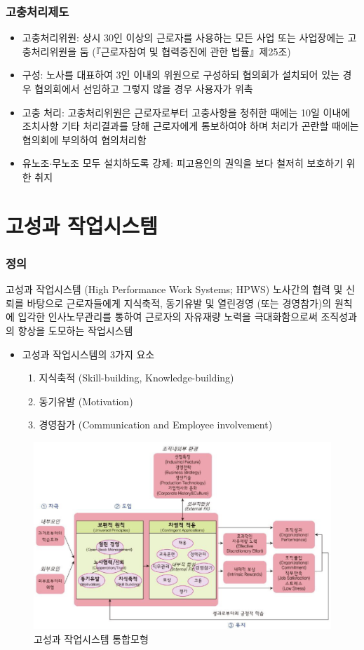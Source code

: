 \documentclass[aspectratio=169,xcolor=dvipsnames,handout]{beamer}
\begin{document}
\begin{frame}
    \frametitle{고충처리제도}
    \begin{itemize}[<+->]
        \item 고충처리위원: 상시 30인 이상의 근로자를 사용하는 모든 사업 또는 사업장에는 고충처리위원을 둠 (『근로자참여 및 협력증진에 관한 법률』제25조)
        \item 구성: 노사를 대표하여 3인 이내의 위원으로 구성하되 협의회가 설치되어 있는 경우 협의회에서 선임하고 그렇지 않을 경우 사용자가 위촉
        \item 고충 처리: 고충처리위원은 근로자로부터 고충사항을 청취한 때에는 10일 이내에 조치사항 기타 처리결과를 당해 근로자에게 통보하여야 하며 처리가 곤란할 때에는 협의회에 부의하여 협의처리함
        \item 유노조$\cdot$무노조 모두 설치하도록 강제: 피고용인의 권익을 보다 철저히 보호하기 위한 취지
    \end{itemize}
\end{frame}

\section{고성과 작업시스템}

\begin{frame}[allowframebreaks]
    \frametitle{정의}
    \begin{block}{고성과 작업시스템 (High Performance Work Systems; HPWS)}
        노사간의 협력 및 신뢰를 바탕으로 근로자들에게 지식축적, 동기유발 및 열린경영 (또는 경영참가)의 원칙에 입각한 인사노무관리를 통하여 근로자의 자유재량 노력을 극대화함으로써 조직성과의 향상을 도모하는 작업시스템
    \end{block}
    \begin{itemize}[<+->]
        \item 고성과 작업시스템의 3가지 요소
        \begin{enumerate}[<+->]
            \item 지식축적 (Skill-building, Knowledge-building)
            \item 동기유발 (Motivation)
            \item 경영참가 (Communication and Employee involvement)
        \end{enumerate}
    \end{itemize}
    \centering
    \begin{figure}
        \includegraphics[width=.65\textwidth]{pic/HPWS.png}
        \caption{고성과 작업시스템 통합모형}
    \end{figure}
\end{frame}
\end{document}
